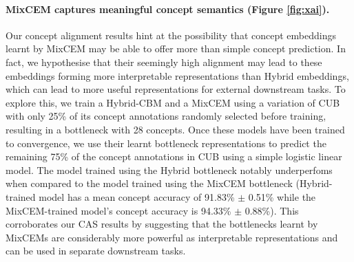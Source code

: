 \documentclass[withindex,glossary]{cam-thesis}
\theoremstyle{plain}
\theoremstyle{definition}
\theoremstyle{remark}
\begin{document}
\paragraph{MixCEM captures meaningful concept semantics (Figure \ref{fig:xai}).}
Our concept alignment results hint at the possibility that concept embeddings learnt by MixCEM may be able to offer more than simple concept prediction. In fact, we hypothesise that their seemingly high alignment may lead to these embeddings forming more interpretable representations than Hybrid embeddings, which can lead to more useful representations for external downstream tasks. To explore this, we train a Hybrid-CBM and a MixCEM using a variation of CUB with only 25\% of its concept annotations randomly selected before training, resulting in a bottleneck with 28 concepts. Once these models have been trained to convergence,
we use their learnt bottleneck representations to predict the remaining 75\% of the concept annotations in CUB using a simple logistic linear model. The model trained using the Hybrid bottleneck notably underperfoms when compared to the model trained using the MixCEM bottleneck (Hybrid-trained model has a mean concept accuracy of 91.83\% $\pm$ 0.51\% while the MixCEM-trained model's concept accuracy is 94.33\% $\pm$ 0.88\%). This corroborates our CAS results by suggesting that the bottlenecks learnt by MixCEMs are considerably more powerful as interpretable representations and can be used in separate downstream tasks.
\end{document}
